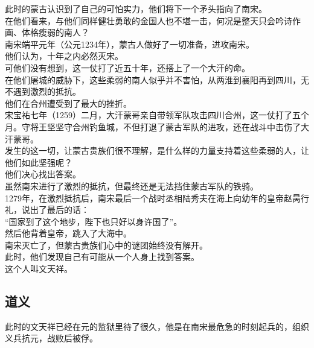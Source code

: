 \begin{multicols}{\theparacolNo}
此时的蒙古认识到了自己的可怕实力，他们将下一个矛头指向了南宋。\\

在他们看来，与他们同样健壮勇敢的金国人也不堪一击，何况是整天只会吟诗作画、体格瘦弱的南人？\\

南宋端平元年（公元1234年），蒙古人做好了一切准备，进攻南宋。\\

他们认为，十年之内必然灭宋。\\

可他们没有想到，这一仗打了近五十年，还搭上了一个大汗的命。\\

在他们屠城的威胁下，这些柔弱的南人似乎并不害怕，从两淮到襄阳再到四川，无不遇到激烈的抵抗。\\

他们在合州遭受到了最大的挫折。\\

宋宝祐七年（1259）二月，大汗蒙哥亲自带领军队攻击四川合州，这一仗打了五个月。守将王坚坚守合州钓鱼城，不但打退了蒙古军队的进攻，还在战斗中击伤了大汗蒙哥。\\

发生的这一切，让蒙古贵族们很不理解，是什么样的力量支持着这些柔弱的人，让他们如此坚强呢？\\

他们决心找出答案。\\

虽然南宋进行了激烈的抵抗，但最终还是无法挡住蒙古军队的铁骑。\\

1279年，在激烈抵抗后，南宋最后一个战时丞相陆秀夫在海上向幼年的皇帝赵昺行礼，说出了最后的话：\\

“国家到了这个地步，陛下也只好以身许国了”。\\

然后他背着皇帝，跳入了大海中。\\

南宋灭亡了，但蒙古贵族们心中的谜团始终没有解开。\\

此时，他们发现自己有可能从一个人身上找到答案。\\

这个人叫文天祥。\\

\subsection{道义}
此时的文天祥已经在元的监狱里待了很久，他是在南宋最危急的时刻起兵的，组织义兵抗元，战败后被俘。\\


\end{multicols}
